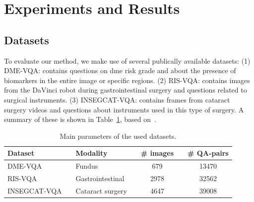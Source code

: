 \section{Experiments and Results}
\label{sec:locvqallm_results}

\subsection{Datasets} 
To evaluate our method, we make use of several publically available datasets: (1) DME-VQA: contains questions on \gls{dme} risk grade and about the presence of biomarkers in the entire image or specific regions. (2) RIS-VQA: contains images from the DaVinci robot during gastrointestinal surgery and questions related to surgical instruments. (3) INSEGCAT-VQA: contains frames from cataract surgery videos and questions about instruments used in this type of surgery. A summary of these is shown in Table~\ref{tab:locvqallm_datasets}, based on~\cite{tascon2023localized}.

\begin{table}[ht]
\begin{center}
\begin{tabular}{lp{0.5cm}lp{0.5cm}cp{0.5cm}c}
\toprule
Dataset                       && Modality         && \# images && \# QA-pairs \\ \midrule
DME-VQA                        && Fundus && 679 && 13470 \\
RIS-VQA                        && Gastrointestinal && 2978 && 32562 \\
INSEGCAT-VQA                   && Cataract surgery && 4647 && 39008 \\
\bottomrule
\end{tabular}
\end{center}
\caption{Main parameters of the used datasets.}
\label{tab:locvqallm_datasets}
\end{table}

